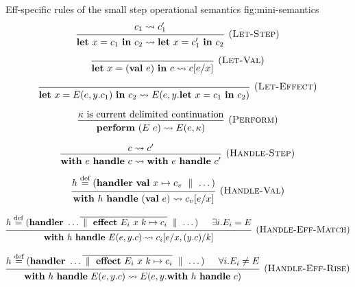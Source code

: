 \documentclass[class=article, crop=false]{standalone}
\begin{document}
\begin{myfigure}[1]
  {Eff-specific rules of the small step operational semantics}
  {fig:mini-semantics}
  $$
  \begin{prooftree}
    \hypo{c_1 \leadsto c_1'}
    \infer1[(\textsc{Let-Step})]{\effLet x = c_1 \effIn c_2 \leadsto \effLet x = c_1' \effIn c_2}
  \end{prooftree}
  $$

  $$
  \begin{prooftree}
    \hypo{}
    \infer1[(\textsc{Let-Val})]{\effLet x = (\effVal e) \effIn c \leadsto c[e/x]}
  \end{prooftree}
  $$
  
  $$
  \begin{prooftree}
    \hypo{}
    \infer1[(\textsc{Let-Effect})]{\effLet x = E(e, y.c_1) \effIn c_2 \leadsto E(e, y.\effLet x = c_1 \effIn c_2)}
  \end{prooftree}
  $$

  $$
    \begin{prooftree}
      \hypo{\kappa \text{ is current delimited continuation}}
      \infer1[(\textsc{Perform})]{\effPerform (E\ e) \leadsto E(e, \kappa)}
    \end{prooftree}
    $$

    $$
    \begin{prooftree}
      \hypo{c \leadsto c'}
      \infer1[(\textsc{Handle-Step})]{\effWith e \effHandle c \leadsto \effWith e \effHandle c'}
    \end{prooftree}
    $$
    
    $$
    \begin{prooftree}
      \hypo{h \stackrel{\text{def}}{=} (\effHandler \effVal x \mapsto c_v \dmid \dots)}
      \infer1[(\textsc{Handle-Val})]{\effWith h \effHandle (\effVal e) \leadsto c_v[e/x]}
    \end{prooftree}
    $$
    
    $$
    \begin{prooftree}
      \hypo{h \stackrel{\text{def}}{=} (\effHandler \dots \overline{\dmid \effEffect E_i\ x\ k \mapsto c_i} \dmid \dots)}
      \hypo{\exists i. E_i = E}
      \infer2[(\textsc{Handle-Eff-Match})]{\effWith h \effHandle E(e, y.c) \leadsto c_i[e/x, (y.c)/k]}
    \end{prooftree}
    $$
    
    $$
    \begin{prooftree}
      \hypo{h \stackrel{\text{def}}{=} (\effHandler \dots \overline{\dmid \effEffect E_i\ x\ k \mapsto c_i} \dmid \dots)}
      \hypo{\forall i. E_i \neq E}
      \infer2[(\textsc{Handle-Eff-Rise})]{\effWith h \effHandle E(e, y.c) \leadsto E( e, y. \effWith h \effHandle c)}
    \end{prooftree}
    $$
\end{myfigure}
\end{document}

